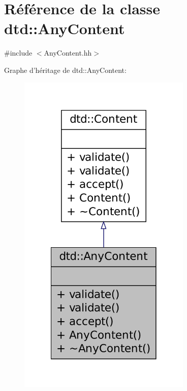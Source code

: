 \hypertarget{classdtd_1_1_any_content}{
\section{Référence de la classe dtd::AnyContent}
\label{classdtd_1_1_any_content}
}


{\ttfamily \#include $<$AnyContent.hh$>$}



Graphe d'héritage de dtd::AnyContent:\nopagebreak
\begin{figure}[H]
\begin{center}
\leavevmode
\includegraphics[width=234pt]{classdtd_1_1_any_content__inherit__graph}
\end{center}
\end{figure}


